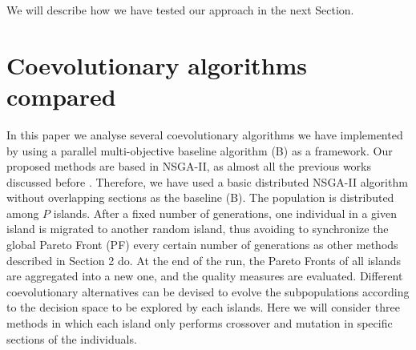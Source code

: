 \documentclass[preprint]{elsarticle}
\begin{document}
We will describe how we have tested our approach in the next Section.




%
%

\section{Coevolutionary algorithms compared}
\label{sec:coevo}

In this paper we analyse several coevolutionary algorithms we have implemented by using a parallel multi-objective baseline algorithm (B) as a framework. Our proposed methods are based in NSGA-II, as almost all the previous works discussed before \cite{Dorronsoro13superlinear,Durillo08masterslave,Hiroyasu07discussion,Deb03distributed,Xiao03specialized,Wang09parallel,Martens13asynchronous}. Therefore, we have used a basic distributed NSGA-II algorithm without overlapping sections as the baseline (B). The population is distributed among $P$ islands. After a fixed number of generations, one individual in a given island is migrated to another random island, thus avoiding to synchronize the global Pareto Front (PF) every certain number of generations as other methods described in Section 2 do. At the end of the run, the Pareto Fronts of all islands are aggregated into a new one, and the quality measures are evaluated.
Different coevolutionary alternatives can be devised to evolve the subpopulations according to the decision space to be explored by each islands. Here we will consider three methods in which each island only performs crossover and mutation in specific sections of the individuals.



%
\end{document}

